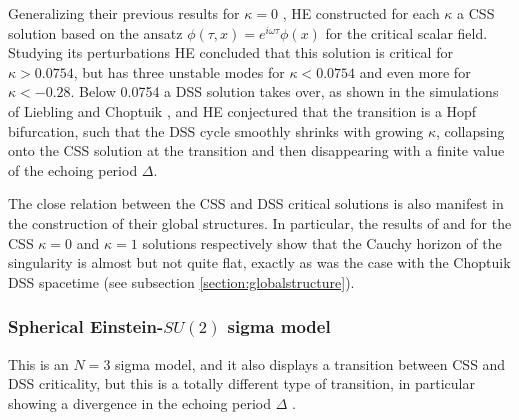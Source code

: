 \documentclass{article}
\begin{document}
Generalizing their previous results for $\kappa=0$ \cite{HE1,HE2},
HE constructed for each $\kappa$ a CSS solution
based on the ansatz $\phi(\tau,x)=e^{i\omega\tau}\phi(x)$
for the critical scalar field. Studying its perturbations
HE concluded that this solution is critical for
$\kappa>0.0754$, but has three unstable modes for $\kappa<0.0754$ and
even more for $\kappa<-0.28$. Below 0.0754 a DSS solution takes over,
as shown in the simulations of Liebling and Choptuik
\cite{LieblingChoptuik}, and HE conjectured that the transition is
a Hopf bifurcation, such that the DSS cycle smoothly shrinks with
growing $\kappa$, collapsing onto the CSS solution at the transition
and then disappearing with a finite value of the echoing period
$\Delta$.

The close relation between the CSS and DSS critical solutions is also 
manifest in the construction of their global structures. In particular,
the results of \cite{HE2} and \cite{EardleyHirschmannHorne} for the CSS
$\kappa=0$ and $\kappa=1$ solutions respectively show that the Cauchy
horizon of the singularity is almost but not quite flat, exactly as
was the case with the Choptuik DSS spacetime (see subsection
\ref{section:globalstructure}).


\subsubsection{Spherical Einstein-$SU(2)$ sigma model}

This is an $N=3$ sigma model, and it also displays a transition
between CSS and DSS criticality, but this is a totally different
type of transition, in particular showing a divergence in the
echoing period $\Delta$ \cite{Aichelburg1}.
\end{document}
